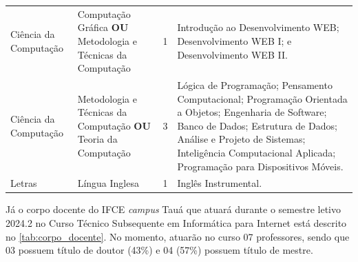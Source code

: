 \documentclass[
	12pt,				%
	openright,			%
	twoside,			%
	a4paper,			%
	chapter=TITLE,		%
	english,			%
	french,				%
	spanish,			%
	brazil,				%
	]{abntex2}
\begin{document}
\begin{quadro}[htpb]
{\begin{tabular}{ p{} p{} c p{}}
   \cellcolor{gray!05}Ciência da \newline Computação  &  \cellcolor{gray!05}Computação \newline Gráfica \newline \qquad\textbf{OU} \newline Metodologia e \newline Técnicas da \newline Computação &  \cellcolor{gray!05}1 &   \cellcolor{gray!05} Introdução ao Desenvolvimento WEB; \newline  Desenvolvimento WEB I; e \newline Desenvolvimento WEB II. \\[1em]
        
        Ciência da \newline Computação       &  Metodologia e \newline Técnicas da \newline Computação  \newline \textbf{OU} \newline Teoria da Computação &  3 & Lógica de Programação;  \newline Pensamento Computacional; \newline Programação Orientada a Objetos; \newline Engenharia de Software; \newline Banco de Dados; \newline Estrutura de Dados; \newline Análise e Projeto de Sistemas; \newline Inteligência Computacional Aplicada; \newline Programação para Dispositivos Móveis.\\
        
        \cellcolor{gray!05}Letras &   \cellcolor{gray!05}Língua Inglesa     &    \cellcolor{gray!05}1 &   \cellcolor{gray!05}Inglês Instrumental.  \\
       

        \bottomrule
    \end{tabular}
   }{
            \vspace{-1em}
   }
\end{quadro}
Já o corpo docente do IFCE \textit{campus} Tauá que atuará durante o semestre
letivo 2024.2 no Curso  Técnico Subsequente em Informática para Internet está
descrito no \autoref{tab:corpo_docente}. No momento, atuarão no curso 07
professores, sendo que 03 possuem título de doutor (43\%) e  04 (57\%) possuem título de mestre.
\end{document}
